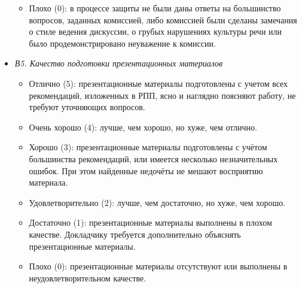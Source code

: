 \documentclass{article}
\begin{document}
\begin{itemize}
\begin{itemize}
        \item Плохо (0): в процессе защиты не были даны ответы на большинство вопросов, заданных комиссией, либо комиссией были сделаны замечания о стиле ведения дискуссии, о грубых нарушениях культуры речи или было продемонстрировано неуважение к комиссии.
    \end{itemize}
    \item \textit{В5. Качество подготовки презентационных материалов}
    \begin{itemize}
        \item Отлично (5): презентационные материалы подготовлены с учетом всех рекомендаций, изложенных в РПП, ясно и наглядно поясняют работу, не требуют уточняющих вопросов.
        \item Очень хорошо (4): лучше, чем хорошо, но хуже, чем отлично.
        \item Хорошо (3): презентационные материалы подготовлены с учётом большинства рекомендаций, или имеется несколько незначительных ошибок. При этом найденные недочёты не мешают восприятию материала.
        \item Удовлетворительно (2): лучше, чем достаточно, но хуже, чем хорошо.
        \item Достаточно (1): презентационные материалы выполнены в плохом качестве. Докладчику требуется дополнительно объяснять презентационные материалы.
        \item Плохо (0): презентационные материалы отсутствуют или выполнены в неудовлетворительном качестве.
    \end{itemize}
\end{itemize}
\end{document}
